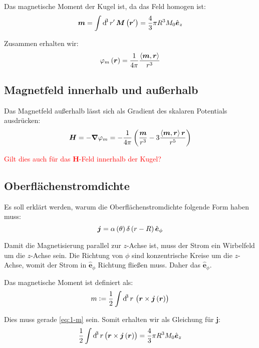 \documentclass[11pt, ngerman, fleqn]{article}
\newcommand{\ev}{\hat{\vec e}}
\newcommand{\half}{\frac 12}
\newcommand{\inner}[2]{\left\langle #1, #2 \right\rangle}
\newcommand{\vnabla}{\vec \nabla}
\renewcommand{\vec}[1]{\boldsymbol{#1}}
\begin{document}
Das magnetische Moment der Kugel ist, da das Feld homogen ist:
\begin{equation}
	\label{eq:1-m}
	\vec m = \int \dif^3 r' \, \vec M \del{\vec r'} = \frac 43 \pi R^3 M_0 \ev_z
\end{equation}

Zusammen erhalten wir:
\[
	\varphi_m \del{\vec r}
	= \frac{1}{4\pi} \frac{\inner{\vec m}{\vec r}}{r^3}
\]

\subsection{Magnetfeld innerhalb und außerhalb}

Das Magnetfeld außerhalb lässt sich als Gradient des skalaren Potentials
ausdrücken:
\[
	\vec H
	= - \vnabla \varphi_m
	= - \frac{1}{4 \pi} \del{\frac{\vec m}{r^3} - 3 \frac{\inner{\vec m}{\vec r} \vec r}{r^5}}
\]

\textcolor{red}{Gilt dies auch für das $\vec H$-Feld innerhalb der Kugel?}

\subsection{Oberflächenstromdichte}

Es soll erklärt werden, warum die Oberflächenstromdichte folgende Form haben
muss:
\[
	\vec j = \alpha\del\theta \delta\del{r-R} \ev_\phi
\]

Damit die Magnetisierung parallel zur $z$-Achse ist, muss der Strom ein
Wirbelfeld um die $z$-Achse sein. Die Richtung von $\phi$ sind konzentrische
Kreise um die $z$-Achse, womit der Strom in $\ev_\phi$ Richtung fließen
muss. Daher das $\ev_\phi$.

Das magnetische Moment ist definiert als:
\[
	m := \half \int \dif^3 r \, \del{\vec r \times \vec j\del{\vec r}}
\]

Dies muss gerade \eqref{eq:1-m} sein. Somit erhalten wir als Gleichung für
$\vec j$:
\[
	\half \int \dif^3 r \del{\vec r \times \vec j\del{\vec r}}
	= \frac 43 \pi R^3 M_0 \ev_z
\]
\end{document}
